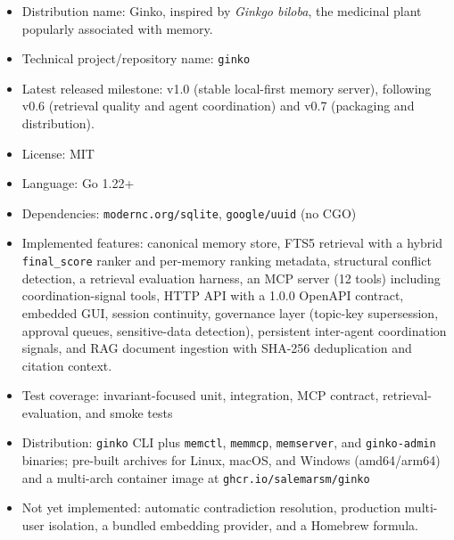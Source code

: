 \documentclass[11pt,a4paper]{article}
\begin{document}
\begin{itemize}
 \item Distribution name: Ginko, inspired by \textit{Ginkgo biloba}, the medicinal plant popularly associated with memory.
 \item Technical project/repository name: \texttt{ginko}
 \item Latest released milestone: v1.0 (stable local-first memory server), following v0.6 (retrieval quality and agent coordination) and v0.7 (packaging and distribution).
 \item License: MIT
 \item Language: Go 1.22+
 \item Dependencies: \texttt{modernc.org/sqlite}, \texttt{google/uuid} (no CGO)
 \item Implemented features: canonical memory store, FTS5 retrieval with a hybrid \texttt{final\_score} ranker and per-memory ranking metadata, structural conflict detection, a retrieval evaluation harness, an MCP server (12 tools) including coordination-signal tools, HTTP API with a 1.0.0 OpenAPI contract, embedded GUI, session continuity, governance layer (topic-key supersession, approval queues, sensitive-data detection), persistent inter-agent coordination signals, and RAG document ingestion with SHA-256 deduplication and citation context.
 \item Test coverage: invariant-focused unit, integration, MCP contract, retrieval-evaluation, and smoke tests
 \item Distribution: \texttt{ginko} CLI plus \texttt{memctl}, \texttt{memmcp}, \texttt{memserver}, and \texttt{ginko-admin} binaries; pre-built archives for Linux, macOS, and Windows (amd64/arm64) and a multi-arch container image at \texttt{ghcr.io/salemarsm/ginko}
 \item Not yet implemented: automatic contradiction resolution, production multi-user isolation, a bundled embedding provider, and a Homebrew formula.
\end{itemize}
\end{document}
